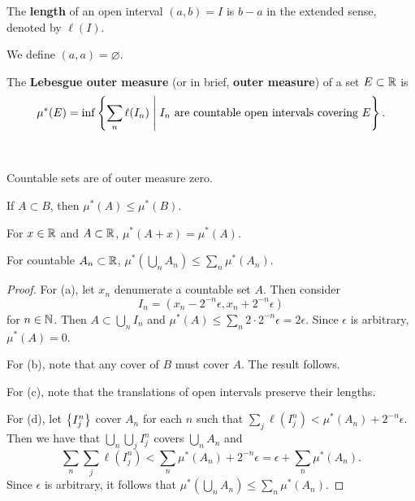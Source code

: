 \begin{definition}
    The \textbf{length} of an open interval $(a,b) = I$ is $b-a$ in the 
    extended sense, denoted by $\ell(I)$.
\end{definition}
\begin{remark}
    We define $(a,a) = \varnothing$.
\end{remark}

\begin{definition}
    The \textbf{Lebesgue outer measure} (or in brief, \textbf{outer measure}) 
    of a set $E\subset\mathbb{R}$ is 
    \begin{equation*}
        \mu^*(E) = \inf\left\{ \sum_n \ell(I_n) \;\middle\vert\; I_n\text{ are countable open intervals covering } E \right\}.
    \end{equation*}
\end{definition}

\begin{proposition}\ \vspace{-1em}
    \begin{thmenum}
        \item Countable sets are of outer measure zero.
        \item If $A\subset B$, then $\mu^*(A)\leq \mu^*(B)$.
        \item For $x\in\mathbb{R}$ and $A\subset\mathbb{R}$, $\mu^*(A+x) = \mu^*(A)$.
        \item For countable $A_n\subset\mathbb{R}$, $\mu^*(\bigcup_n A_n) \leq \sum_n \mu^*(A_n)$. 
    \end{thmenum}
\end{proposition}
\begin{proof}
    For (a), let $x_n$ denumerate a countable set $A$. Then consider
    \begin{equation*}
        I_n = (x_n-2^{-n}\epsilon, x_n+2^{-n}\epsilon)
    \end{equation*} 
    for $n\in\mathbb{N}$. Then $A\subset \bigcup_n I_n$ and $\mu^*(A)
    \leq \sum_n 2\cdot 2^{-n}\epsilon = 2\epsilon$. 
    Since $\epsilon$ is arbitrary, $\mu^*(A) = 0$. 

    For (b), note that any cover of $B$ must cover $A$. The result follows. 

    For (c), note that the translations of open intervals preserve their lengths. 

    For (d), let $\left\{ {I_j^n} \right\}$ cover $A_n$ for each $n$ such that 
    $\sum_j \ell(I_j^n) < \mu^*(A_n) + 2^{-n}\epsilon$. Then we have 
    that $\bigcup_n\bigcup_j I_j^n$ covers $\bigcup_n A_n$ and 
    \begin{equation*}
        \sum_n\sum_j \ell(I_j^n) < \sum_n \mu^*(A_n) + 2^{-n}\epsilon 
        = \epsilon + \sum_n \mu^*(A_n).
    \end{equation*}
    Since $\epsilon$ is arbitrary, it follows that $\mu^*(\bigcup_n A_n) \leq \sum_n \mu^*(A_n)$.
\end{proof}

